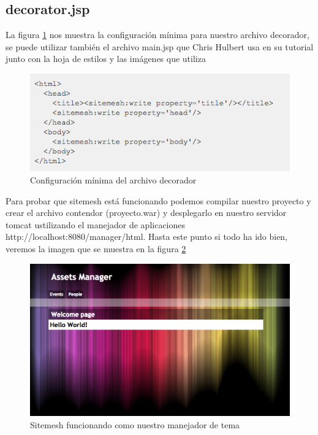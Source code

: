 \documentclass[12pt]{article}
\begin{document}
        \subsection{decorator.jsp}
        La figura \ref{09_decorator_jsp} nos muestra la configuraci\'on m\'inima para nuestro archivo decorador, se puede utilizar tambi\'en el archivo main.jsp que Chris Hulbert usa en su tutorial junto con la hoja de estilos y las im\'agenes que utiliza
        \begin{figure}[h]
            \centering
            \includegraphics[scale=0.7]{09_decorator_jsp}
            \caption{Configuraci\'on m\'inima del archivo decorador}
            \label{09_decorator_jsp}
        \end{figure}
        
        Para probar que sitemesh est\'a funcionando podemos compilar nuestro proyecto y crear el archivo contendor (proyecto.war) y desplegarlo en nuestro servidor tomcat ustilizando el manejador de aplicaciones http://localhost:8080/manager/html. Hasta este punto si todo ha ido bien, veremos la imagen que se muestra en la figura \ref{10_tomcat_sitemesh}
        \begin{figure}[h]
            \centering
            \includegraphics[scale=0.4]{10_tomcat_sitemesh}
            \caption{Sitemesh funcionando como nuestro manejador de tema}
            \label{10_tomcat_sitemesh}
        \end{figure}
		\newpage
\end{document}
